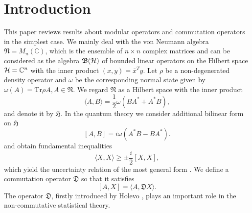 \section{Introduction}
This paper reviews results about  modular operators \cite{Longo_1978} and  commutation operators \cite{Holevo_1977} in the simplest case.
We mainly deal with the von Neumann algebra $\mathfrak{N}=M_n(\mathbb{C})$, 
which is the ensemble of $n\times n$ complex matrices and can be considered as the algebra $\mathfrak{B}({\cal H})$ of bounded linear operators on 
the Hilbert space ${\cal H}=\mathbb{C}^{n}$ with the inner product $(x,y)=\bar{x}^Ty$. 
Let $\rho$ be a non-degenerated density operator and 
$\omega$ be the corresponding normal state given by $\omega(A)=\mbox{Tr}\rho A, A\in \mathfrak{N}$.
We regard $\mathfrak{N}$ as a Hilbert space with the inner product
\begin{equation}
\label{innerP}
\langle A, B \rangle =\frac{1}{2}\omega(BA^{\ast}+A^{\ast}B),
\end{equation}
and denote it by $\mathfrak{H}$.
In the quantum theory we consider additional bilinear form on $\mathfrak{H}$ 
\begin{equation}\label{Bform}
[A,B]=i\omega(A^{\ast}B-BA^{\ast}).
\end{equation}
and  obtain fundamental inequalities 
$$
\langle X, X\rangle \geq \pm \frac{i}{2}[X,X],
$$
which yield  the uncertainty relation of the most general form \cite{Holevo_1977}.
We define a commutation operator $\mathfrak{D}$ so that it satisfies 
\begin{equation}\label{Copr}
[A,X]=\langle A, \mathfrak{D}X\rangle.
\end{equation}
The operator $\mathfrak{D}$, firstly introduced by Holevo \cite{Holevo_1977}, plays an important role in the non-commutative statistical theory.  

